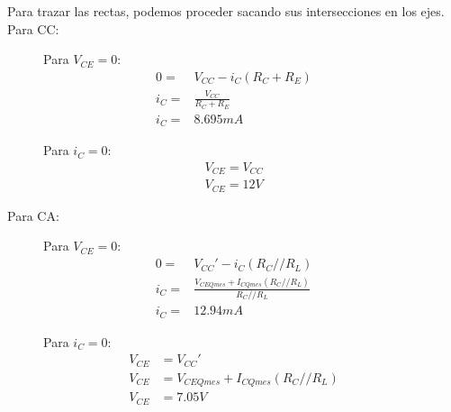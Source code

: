 \documentclass[chaptersright]{informeutn}
\begin{document}
    Para trazar las rectas, podemos proceder sacando sus intersecciones en los ejes. Para CC:
    \begin{figure}[H]
      \centering
      \begin{minipage}[t]{0.49\textwidth}
        Para $V_{CE} = 0$:
        \begin{align*}
          0 =& V_{CC} - i_C(R_C + R_E)\\[6pt]
          i_C =& \frac{V_{CC}}{R_C + R_E}\\[6pt]
          i_C =& 8.695mA
        \end{align*}
      \end{minipage}
      \begin{minipage}[t]{0.49\textwidth}
        Para $i_C = 0$:
        \begin{align*}
          V_{CE} = V_{CC}\\[6pt]
          V_{CE} = 12V
        \end{align*}
      \end{minipage}
    \end{figure}

    Para CA:
    \begin{figure}[H]
      \centering
      \begin{minipage}[t]{0.49\textwidth}
        Para $V_{CE} = 0$:
        \begin{align*}
          0 =& V_{CC}' - i_C(R_C//R_L)\\[6pt]
          i_C =& \frac{V_{CEQ mes} + I_{CQ mes} (R_C//R_L)}{R_C//R_L}\\[6pt]
          i_C =& 12.94mA
        \end{align*}
      \end{minipage}
      \begin{minipage}[t]{0.49\textwidth}
        Para $i_C = 0$:
        \begin{align*}
          V_{CE} &= V_{CC}'\\[6pt]
          V_{CE} &= V_{CEQ mes} + I_{CQ mes} (R_C//R_L)\\[6pt]
          V_{CE} &= 7.05V
        \end{align*}
      \end{minipage}
    \end{figure}
\end{document}
